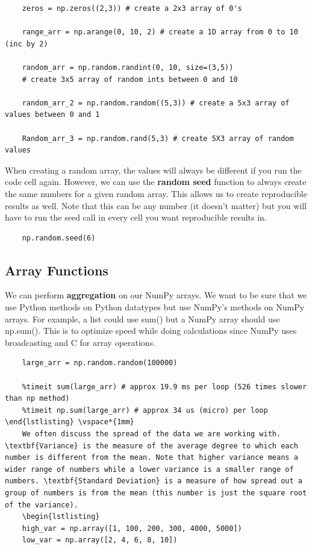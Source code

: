 \documentclass[11pt, a4paper]{article}
\begin{document}
\begin{spacing}{1.1}
\begin{lstlisting}
	zeros = np.zeros((2,3)) # create a 2x3 array of 0's
	
	range_arr = np.arange(0, 10, 2) # create a 1D array from 0 to 10 (inc by 2)
	
	random_arr = np.random.randint(0, 10, size=(3,5)) 
	# create 3x5 array of random ints between 0 and 10
	
	random_arr_2 = np.random.random((5,3)) # create a 5x3 array of values between 0 and 1
	
	Random_arr_3 = np.random.rand(5,3) # create 5X3 array of random values \end{lstlisting} \vspace*{1mm} 	
	When creating a random array, the values will always be different if you run the code cell again. However, we can use the \textbf{random seed} function to always create the same numbers for a given random array. This allows us to create reproducible results as well. Note that this can be any number (it doesn't matter) but you will have to run the seed call in every cell you want reproducible results in. 
	\begin{lstlisting}
	np.random.seed(6) \end{lstlisting} \newpage

	\subsection{Array Functions}
	We can perform \textbf{aggregation} on our NumPy arrays. We want to be sure that we use Python methods on Python datatypes but use NumPy's methods on NumPy arrays. For example, a list could use sum() but a NumPy array should use np.sum(). This is to optimize speed while doing calculations since NumPy uses broadcasting and C for array operations.
	\begin{lstlisting}
	large_arr = np.random.random(100000)
	
	%timeit sum(large_arr) # approx 19.9 ms per loop (526 times slower than np method)
	%timeit np.sum(large_arr) # approx 34 us (micro) per loop \end{lstlisting} \vspace*{1mm} 
	We often discuss the spread of the data we are working with. \textbf{Variance} is the measure of the average degree to which each number is different from the mean. Note that higher variance means a wider range of numbers while a lower variance is a smaller range of numbers. \textbf{Standard Deviation} is a measure of how spread out a group of numbers is from the mean (this number is just the square root of the variance). 
	\begin{lstlisting}
	high_var = np.array([1, 100, 200, 300, 4000, 5000])
	low_var = np.array([2, 4, 6, 8, 10])
	

\end{lstlisting}
\end{spacing}
\end{document}
